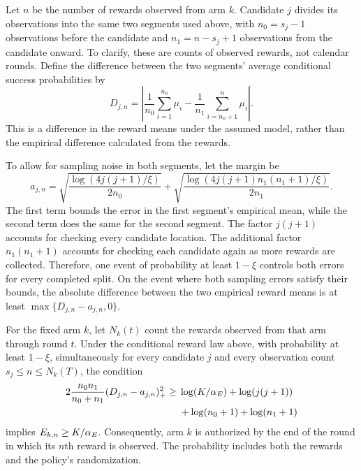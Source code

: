 Let $n$ be the number of rewards observed from arm $k$. Candidate $j$ divides its observations
into the same two segments used above, with
$n_0=s_j-1$ observations before the candidate and
$n_1=n-s_j+1$ observations from the candidate onward.
To clarify, these are counts of observed rewards, not calendar rounds.
Define the difference between the two segments' average conditional
success probabilities by
\[
D_{j,n}
=
\left|
\frac{1}{n_0}\sum_{i=1}^{n_0}\mu_i
-
\frac{1}{n_1}\sum_{i=n_0+1}^{n}\mu_i
\right|.
\]
This is a difference in the reward means under the assumed model,
rather than the empirical difference calculated from the rewards.

To allow for sampling noise in both segments, let the margin be
\[
a_{j,n}
=
\sqrt{\frac{\log(4j(j+1)/\xi)}{2n_0}}
+
\sqrt{\frac{\log(4j(j+1)n_1(n_1+1)/\xi)}{2n_1}}.
\]
The first term bounds the error in the first segment's empirical mean, while
the second term does the same for the second segment.
The factor $j(j+1)$ accounts for checking every candidate location.
The additional factor $n_1(n_1+1)$ accounts for checking each
candidate again as more rewards are collected.
Therefore, one event of probability at least $1-\xi$ controls both errors
for every completed split.
On the event where both sampling errors satisfy their bounds,
the absolute difference between the two empirical reward means is at
least $\max\{D_{j,n}-a_{j,n},0\}$.

\begin{theorem}
\label{thm:adaptive-power}
For the fixed arm $k$, let $N_k(t)$ count the rewards observed
from that arm through round $t$.
Under the conditional reward law above, with probability at least
$1-\xi$, simultaneously for every candidate $j$ and every observation
count $s_j\leq n\leq N_k(T)$, the condition
\begin{equation}
\begin{split}
2\frac{n_0n_1}{n_0+n_1}(D_{j,n}-a_{j,n})_+^2
\geq{}&
\log(K/\alpha_E)+\log(j(j+1))
\\
&+\log(n_0+1)+\log(n_1+1)
\end{split}
\label{eq:adaptive-power}
\end{equation}
implies $E_{k,n}\geq K/\alpha_E$.
Consequently, arm $k$ is authorized by the end of the round in which
its $n$th reward is observed.
The probability includes both the rewards and the policy's randomization.
\end{theorem}

